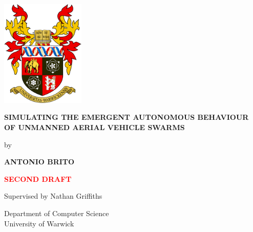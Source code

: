 \documentclass[12pt]{article}
\begin{document}
\begin{titlepage}
    \centering
    \vspace*{1cm}

    
    
    \includegraphics[width=0.3\textwidth]{crest}

    \vspace{1.5cm}
    \Large
    \textbf{SIMULATING THE EMERGENT AUTONOMOUS BEHAVIOUR OF UNMANNED AERIAL VEHICLE SWARMS}

    \vspace{1cm}

    by

    \vspace{1cm}
    
    \textbf{ANTONIO BRITO}
    
    \vfill
    \Huge
    \textcolor{red}{\textbf{SECOND DRAFT}}

    \vfill
    \Large
    Supervised by Nathan Griffiths
    
    
    \vspace{1.5cm}
    
    \Large
    Department of Computer Science\\
    University of Warwick\\
    \the\year
    
\end{titlepage}
\tableofcontents
\newpage
\thispagestyle{empty}
\listoffigures
\listoftables
\newpage
\end{document}
